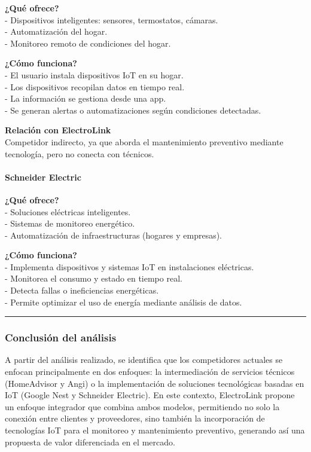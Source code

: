 \textbf{¿Qué ofrece?}\\
- Dispositivos inteligentes: sensores, termostatos, cámaras.\\
- Automatización del hogar.\\
- Monitoreo remoto de condiciones del hogar.

\textbf{¿Cómo funciona?}\\
- El usuario instala dispositivos IoT en su hogar.\\
- Los dispositivos recopilan datos en tiempo real.\\
- La información se gestiona desde una app.\\
- Se generan alertas o automatizaciones según condiciones detectadas.

\textbf{Relación con ElectroLink}\\
Competidor indirecto, ya que aborda el mantenimiento preventivo mediante
tecnología, pero no conecta con técnicos.

\paragraph{Schneider
Electric}\label{report__20-cap2-requirements-analysis.md__schneider-electric}

\textbf{¿Qué ofrece?}\\
- Soluciones eléctricas inteligentes.\\
- Sistemas de monitoreo energético.\\
- Automatización de infraestructuras (hogares y empresas).

\textbf{¿Cómo funciona?}\\
- Implementa dispositivos y sistemas IoT en instalaciones eléctricas.\\
- Monitorea el consumo y estado en tiempo real.\\
- Detecta fallas o ineficiencias energéticas.\\
- Permite optimizar el uso de energía mediante análisis de datos.

\begin{center}\rule{0.5\linewidth}{0.5pt}\end{center}

\subsubsection{Conclusión del
análisis}\label{report__20-cap2-requirements-analysis.md__conclusiuxf3n-del-anuxe1lisis}

A partir del análisis realizado, se identifica que los competidores
actuales se enfocan principalmente en dos enfoques: la intermediación de
servicios técnicos (HomeAdvisor y Angi) o la implementación de
soluciones tecnológicas basadas en IoT (Google Nest y Schneider
Electric). En este contexto, ElectroLink propone un enfoque integrador
que combina ambos modelos, permitiendo no solo la conexión entre
clientes y proveedores, sino también la incorporación de tecnologías IoT
para el monitoreo y mantenimiento preventivo, generando así una
propuesta de valor diferenciada en el mercado.

